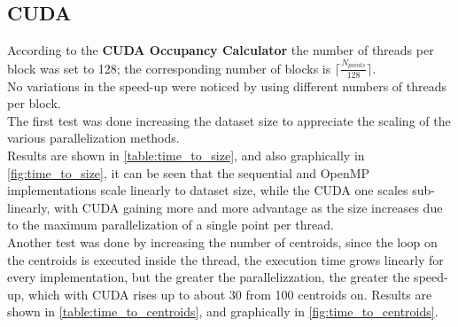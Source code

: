 \documentclass[10pt,twocolumn,letterpaper]{article}
\begin{document}
\subsection{CUDA}
According to the \textbf{CUDA Occupancy Calculator} the number of threads per block was set to 128; the corresponding number of blocks is $\lceil \frac{N_{points}}{128} \rceil$.\\
No variations in the speed-up were noticed by using different numbers of threads per block.\\
The first test was done increasing the dataset size to appreciate the scaling of the various parallelization methods.\\
Results are shown in \cref{table:time_to_size}, and also graphically in \cref{fig:time_to_size}, it can be seen that the sequential and OpenMP implementations scale linearly to dataset size, while the CUDA one scales sub-linearly, with CUDA gaining more and more advantage as the size increases due to the maximum parallelization of a single point per thread.\\
Another test was done by increasing the number of centroids, since the loop on the centroids is executed inside the thread, the execution time grows linearly for every implementation, but the greater the parallelizzation, the greater the speed-up, which with CUDA rises up to about 30 from 100 centroids on. Results are shown in \cref{table:time_to_centroids}, and graphically in \cref{fig:time_to_centroids}.
\end{document}
